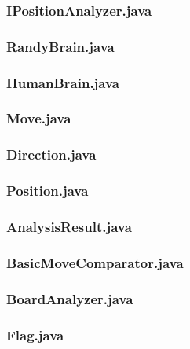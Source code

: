 \documentclass [12pt ,a4paper, english]{scrartcl}
\theoremstyle{plain}
\theoremstyle{definition}
\theoremstyle{remark}
\begin{document}
\subsubsection{IPositionAnalyzer.java}


\subsubsection{RandyBrain.java}
\label{sec:randybrain}


\subsubsection{HumanBrain.java}
\label{sec:humanbrain}


\subsubsection{Move.java}


\subsubsection{Direction.java}


\subsubsection{Position.java}


\subsubsection{AnalysisResult.java}


\subsubsection{BasicMoveComparator.java}


\subsubsection{BoardAnalyzer.java}


\subsubsection{Flag.java}

\end{document}
